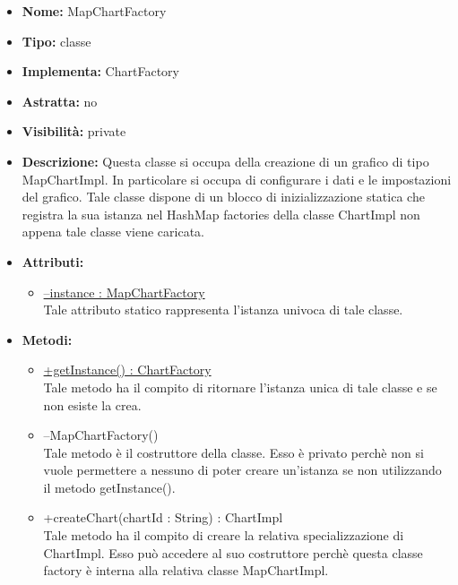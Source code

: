			
			\begin{itemize}
			\item \textbf{Nome:} MapChartFactory
			\item \textbf{Tipo:} classe
			
		\item \textbf{Implementa:}
		ChartFactory
		\item \textbf{Astratta:}
		no
			\item \textbf{Visibilità:} private
			\item \textbf{Descrizione:} Questa classe si occupa della creazione di un grafico di tipo MapChartImpl. In particolare si occupa di configurare i dati e le impostazioni del grafico. Tale classe dispone di un blocco di inizializzazione statica che registra la sua istanza nel HashMap factories della classe ChartImpl non appena tale classe viene caricata.
			\item \textbf{Attributi:}
				\begin{itemize}
				\setlength{\itemsep}{5pt}
				
					\item[\ding{111}] \underline{--instance : MapChartFactory} \\ [1mm] Tale attributo statico rappresenta l'istanza univoca di tale classe.
				\end{itemize}
		
			\item \textbf{Metodi:}
				\begin{itemize}
				\setlength{\itemsep}{5pt}
				
					\item[\ding{111}] {\underline{+getInstance() : ChartFactory}} \\ [1mm] Tale metodo ha il compito di ritornare l'istanza unica di tale classe e se non esiste la crea.
					\item[\ding{111}] {{--MapChartFactory()}} \\ [1mm] Tale metodo è il costruttore della classe. Esso è privato perchè non si vuole permettere a nessuno di poter creare un'istanza se non utilizzando il metodo getInstance().
					\item[\ding{111}] {{+createChart(chartId : String) : ChartImpl}} \\ [1mm] Tale metodo ha il compito di creare la relativa specializzazione di ChartImpl. Esso può accedere al suo costruttore perchè questa classe factory è interna alla relativa classe MapChartImpl.
				\end{itemize}
		
			\end{itemize}

